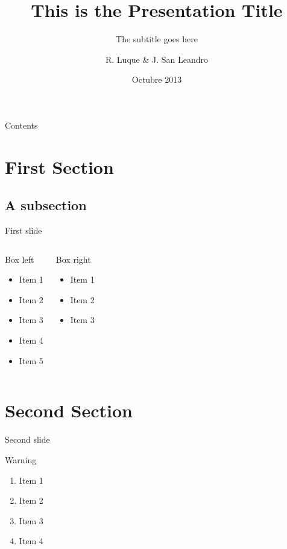 \documentclass{beamer}
\title{This is the Presentation Title}
\subtitle{The subtitle goes here}
\author{R. Luque \& J. San Leandro}
\institute{%
  \href{http://twitter.com/rafael_luque}{@rafael\_luque} - \href{http://osoco.es}{Osoco}
  \hskip20pt
  \href{http://twitter.com/rydnr}{@rydnr} - \href{http://www.ventura24.com}{Ventura24}
}
\date[10/2013]{Octubre 2013}
\begin{document}
\begin{frame}[plain]
  \titlepage
\end{frame}

\begin{frame}[plain]{Contents}
  \tableofcontents[hideallsubsections]
\end{frame}

\section{First Section}

\subsection{A subsection}

\begin{frame}{First slide}
	\begin{columns}[t]
		\begin{block}{Box left}
			\begin{itemize}
				\item Item 1
				\item Item 2
				\item Item 3
				\item Item 4
				\item Item 5
			\end{itemize}
		\end{block}
		\pause

		\begin{block}{Box right}
			\begin{itemize}
				\item Item 1
				\item Item 2
				\item Item 3
			\end{itemize}
		\end{block}
	\end{columns}
\end{frame}

\section{Second Section}

\begin{frame}{Second slide}
  \begin{alertblock}{Warning}
  \begin{enumerate}
    \item Item 1
    \item Item 2
    \item Item 3
    \item Item 4
  \end{enumerate}
  \end{alertblock}
\end{frame}
\end{document}
